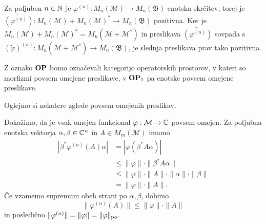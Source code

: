 \begin{dokaz}
    Za poljuben $n \in \mathbb N$ je $\varphi^{(n)}: M_n (\mathcal{M}) \to M_n (\mathfrak{B})$ enotska skrčitev, 
    torej je $\widetilde{(\varphi^{(n)})}: M_n (\mathcal{M}) + M_n (\mathcal{M})^* \to M_n (\mathfrak{B})$ pozitivna.
    Ker je $M_n (\mathcal{M}) + M_n (\mathcal{M})^* = M_n (\mathcal{M} + \mathcal{M}^*)$ in preslikava
    $\widetilde{(\varphi^{(n)})}$ sovpada s $(\tilde{\varphi})^{(n)}: M_n (\mathcal{M} + \mathcal{M}^*) \to M_n (\mathfrak{B})$,
    je slednja preslikava prav tako pozitivna.

\end{dokaz}

\begin{opomba}
    Z oznako $\mathbf{OP}$ bomo označevali kategorijo operatorskih prostorov, v kateri so morfizmi povsem omejene preslikave, 
    v $\mathbf{OP}_1$ pa enotske povsem omejene preslikave.
\end{opomba}

Oglejmo si nekatere zglede povsem omejenih preslikav.

\begin{zgled}
    Dokažimo, da je vsak omejen funkcional $\varphi: \mathcal{M} \to \mathbb C$ povsem omejen.
    Za poljubna enotska vektorja $\alpha, \beta \in \mathbb C^n$ in $A \in M_m (\mathcal{M})$ imamo
    \begin{align*}
        \left| \beta^* \varphi^{(n)} (A) \alpha \right| &= \left| \varphi(\beta^* A \alpha)\right|\\
        &\leq \| \varphi\| \cdot \| \beta^* A \alpha\|\\
        &\leq \| \varphi\| \cdot \| A\| \cdot \| \alpha \| \cdot \| \beta\|\\
        &= \| \varphi\| \cdot \| A\|.
    \end{align*}
    Če vzamemo supremum obeh strani po $\alpha, \beta$, dobimo 
    $$\| \varphi^{(n)} (A)\| \leq \| \varphi\| \cdot \| A\|$$
    in posledično $\| \varphi^{(n)} \| = \| \varphi\|= \| \varphi \|_{\operatorname{po}}$.
\end{zgled}


